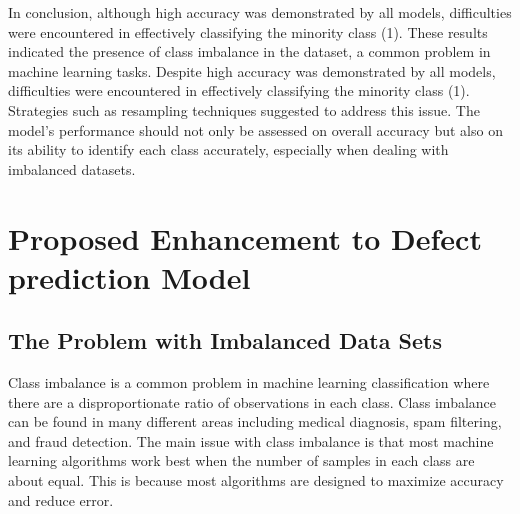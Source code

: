 \documentclass[12pt]{report}
\begin{document}




\newpage
In conclusion, although high accuracy was demonstrated by all models, difficulties were encountered in effectively classifying the minority class (1). These results indicated the presence of class imbalance in the dataset, a common problem in machine learning tasks. Despite high accuracy was demonstrated by all models, difficulties were encountered in effectively classifying the minority class (1). Strategies such as resampling techniques suggested to address this issue. The model's performance should not only be assessed on overall accuracy but also on its ability to identify each class accurately, especially when dealing with imbalanced datasets.

\chapter*{Proposed Enhancement to Defect prediction Model}

\section*{The Problem with Imbalanced Data Sets}
Class imbalance is a common problem in machine learning classification where there are a disproportionate ratio of observations in each class. Class imbalance can be found in many different areas including medical diagnosis, spam filtering, and fraud detection. The main issue with class imbalance is that most machine learning algorithms work best when the number of samples in each class are about equal. This is because most algorithms are designed to maximize accuracy and reduce error.
\end{document}
